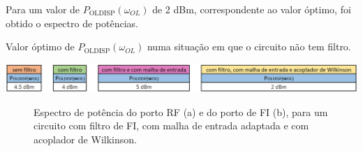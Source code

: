 \documentclass[11pt]{article}
\numberwithin{equation}{section}
\begin{document}
Para um valor de $ P_{\text{OLDISP}}\left(\omega_{OL}\right) $ de 2 dBm, correspondente ao valor óptimo, foi obtido o espectro de potências.

\begin{table}[h]
	\centering
	\caption{Valor óptimo de $ P_{\text{OLDISP}}\left(\omega_{OL}\right) $ numa situação em que o circuito não tem filtro.}
	\vspace{-1.5mm}
	\includegraphics[keepaspectratio=true, scale=0.45]{teoricas/poldispSemComFiltroMalhaAcop}
\end{table}


\begin{figure}[h]
	\centering
	\hspace{8mm}
	\vspace{-0.8em}
	\caption{Espectro de potência do porto RF (a) e do porto de FI (b), para um circuito com filtro de FI, com malha de entrada adaptada e com acoplador de Wilkinson.}
	\vspace{-0.8em}
\end{figure}
\end{document}
